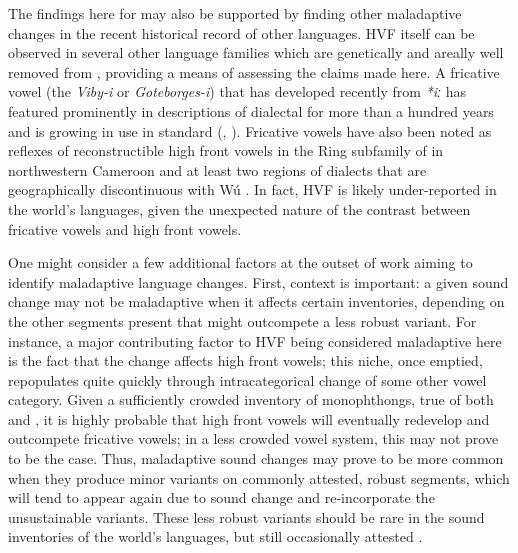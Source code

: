 \documentclass[output=paper,hidelinks]{langscibook}
\begin{document}
The findings here for  may also be supported by finding other maladaptive changes in the recent historical record of other languages.
%
HVF itself can be observed in several other language families which are  genetically and areally well removed from , providing a means of assessing the claims made here.
%
A fricative vowel (the \textit{Viby-i} or \textit{Goteborges-i}) that has developed recently from \textit{*iː} has featured prominently in descriptions of dialectal  for more than a hundred years \citep{gjerdman, karlgren, bjorsten1999, schotz-i} and is growing in use in standard  (\citealt[21]{riad}, \citealt[105]{westerberg}).
%
Fricative vowels have also been noted as reflexes of reconstructible high front vowels in the Ring subfamily of   in northwestern Cameroon and at least two regions of   dialects that are geographically discontinuous with Wú \citep{faytak-qp}.
%
In fact, HVF is likely under-reported in the world's languages, given the unexpected nature of the contrast between fricative vowels and high front vowels.


One might consider a few additional factors at the outset of work aiming to identify maladaptive language changes. First, context is important: a given sound change may not be maladaptive when it affects certain inventories, depending on the other segments present that might outcompete a less robust variant. For instance, a major contributing factor to HVF being considered maladaptive here is the fact that the change affects high front vowels; this niche, once emptied, repopulates quite quickly through intracategorical change of some other vowel category. Given a sufficiently crowded inventory of monophthongs, true of both  and , it is highly probable that high front vowels will eventually redevelop and outcompete fricative vowels; in a less crowded vowel system, this may not prove to be the case. Thus, maladaptive sound changes may prove to be more common when they produce minor variants on commonly attested, robust segments, which will tend to appear again due to sound change and re-incorporate the unsustainable variants. These less robust variants should be rare in the sound inventories of the world’s languages, but still occasionally attested \citep[see also][144--153]{blevins-synopsis}.
\end{document}
